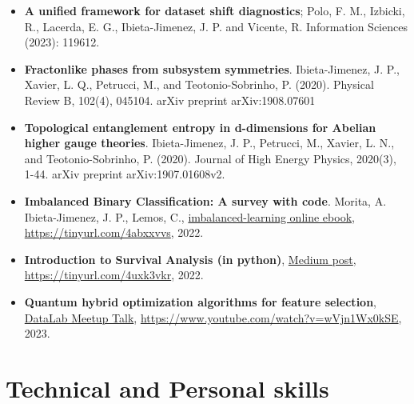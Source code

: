 \documentclass[11pt,a4paper,sans]{moderncv}        %
\begin{document}
\begin{itemize}
\item \textbf{A unified framework for dataset shift diagnostics}; Polo, F. M., Izbicki, R., Lacerda, E. G., Ibieta-Jimenez, J. P. and Vicente, R. Information Sciences (2023): 119612.
\vspace{1pt}
\item \textbf{Fractonlike phases from subsystem symmetries}. Ibieta-Jimenez, J. P., Xavier, L. Q., Petrucci, M., and Teotonio-Sobrinho, P. (2020). Physical Review B, 102(4), 045104. arXiv preprint arXiv:1908.07601
\vspace{1pt}
\item \textbf{Topological entanglement entropy in d-dimensions for Abelian higher gauge theories}. Ibieta-Jimenez, J. P., Petrucci, M., Xavier, L. N., and Teotonio-Sobrinho, P. (2020). Journal of High Energy Physics, 2020(3), 1-44. arXiv preprint arXiv:1907.01608v2.
\vspace{1pt}
\item \textbf{Imbalanced Binary Classification: A survey with code}. Morita, A. Ibieta-Jimenez, J. P., Lemos, C., \href{https://pibieta.github.io/imbalanced_learning/notebooks/Introduction.html}{imbalanced-learning online ebook}, \url{https://tinyurl.com/4abxxvvs}, 2022.


\vspace{1pt}
\item \textbf{Introduction to Survival Analysis (in python)}, \href{https://medium.com/datalab-log/survival-analysis-in-python-5aa9af04318c}{Medium post}, \url{https://tinyurl.com/4uxk3vkr}, 2022.

\vspace{1pt}
\item \textbf{Quantum hybrid optimization algorithms for feature selection}, \href{https://www.youtube.com/watch?v=wVjn1Wx0kSE}{DataLab Meetup Talk}, \url{https://www.youtube.com/watch?v=wVjn1Wx0kSE}, 2023.
\end{itemize}


\section{Technical and Personal skills}

\vspace{4pt}
\end{document}
